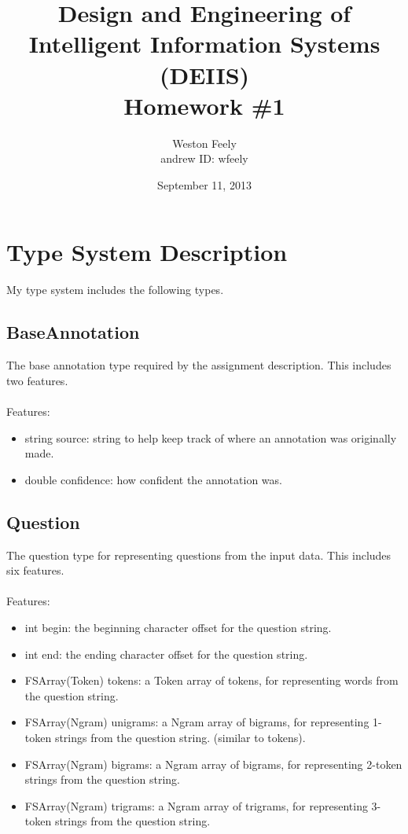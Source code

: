 \documentclass[11pt]{article}
\begin{document}
\title{\textbf{Design and Engineering of Intelligent Information Systems (DEIIS)}\\
	Homework \#1}
\author{Weston Feely \\ andrew ID: wfeely}
\date{September 11, 2013}
\maketitle

\section*{Type System Description}
My type system includes the following types.

\subsection{BaseAnnotation}
The base annotation type required by the assignment description. This includes two features. \\ \\
Features:
\begin{itemize}
\item string source: string to help keep track of where an annotation was originally made.
\item double confidence: how confident the annotation was.
\end{itemize}

\subsection{Question}
The question type for representing questions from the input data. This includes six features. \\ \\
Features:
\begin{itemize}
\item int begin: the beginning character offset for the question string.
\item int end: the ending character offset for the question string.
\item FSArray(Token) tokens: a Token array of tokens, for representing words from the question string.
\item FSArray(Ngram) unigrams: a Ngram array of bigrams, for representing 1-token strings from the question 
string. (similar to tokens).
\item FSArray(Ngram) bigrams: a Ngram array of bigrams, for representing 2-token strings from the question 
string.
\item FSArray(Ngram) trigrams: a Ngram array of trigrams, for representing 3-token strings from the question 
string.
\end{itemize}
\end{document}

